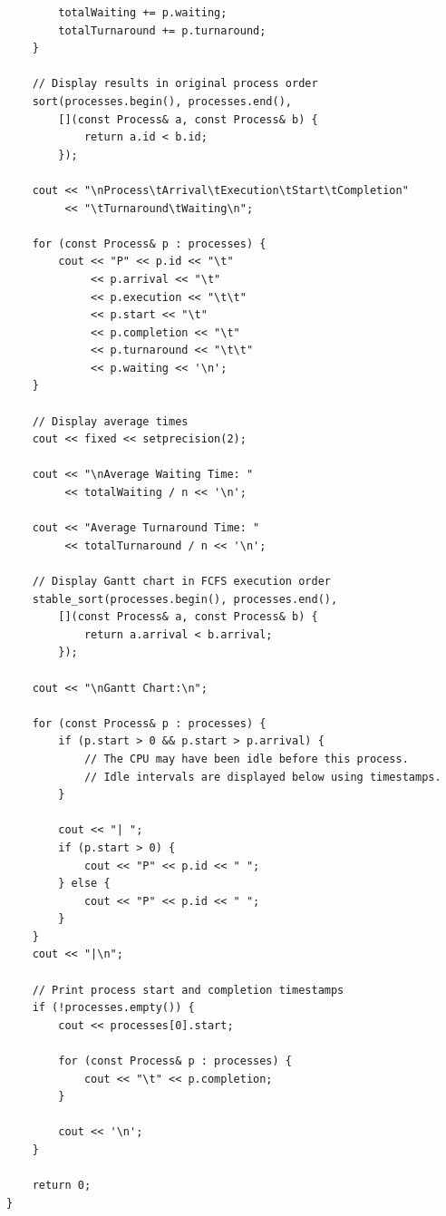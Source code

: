 \documentclass[10pt,a4paper]{article}
\begin{document}
\begin{lstlisting}
        totalWaiting += p.waiting;
        totalTurnaround += p.turnaround;
    }

    // Display results in original process order
    sort(processes.begin(), processes.end(),
        [](const Process& a, const Process& b) {
            return a.id < b.id;
        });

    cout << "\nProcess\tArrival\tExecution\tStart\tCompletion"
         << "\tTurnaround\tWaiting\n";

    for (const Process& p : processes) {
        cout << "P" << p.id << "\t"
             << p.arrival << "\t"
             << p.execution << "\t\t"
             << p.start << "\t"
             << p.completion << "\t"
             << p.turnaround << "\t\t"
             << p.waiting << '\n';
    }

    // Display average times
    cout << fixed << setprecision(2);

    cout << "\nAverage Waiting Time: "
         << totalWaiting / n << '\n';

    cout << "Average Turnaround Time: "
         << totalTurnaround / n << '\n';

    // Display Gantt chart in FCFS execution order
    stable_sort(processes.begin(), processes.end(),
        [](const Process& a, const Process& b) {
            return a.arrival < b.arrival;
        });

    cout << "\nGantt Chart:\n";

    for (const Process& p : processes) {
        if (p.start > 0 && p.start > p.arrival) {
            // The CPU may have been idle before this process.
            // Idle intervals are displayed below using timestamps.
        }

        cout << "| ";
        if (p.start > 0) {
            cout << "P" << p.id << " ";
        } else {
            cout << "P" << p.id << " ";
        }
    }
    cout << "|\n";

    // Print process start and completion timestamps
    if (!processes.empty()) {
        cout << processes[0].start;

        for (const Process& p : processes) {
            cout << "\t" << p.completion;
        }

        cout << '\n';
    }

    return 0;
}
\end{lstlisting}

\end{document}
